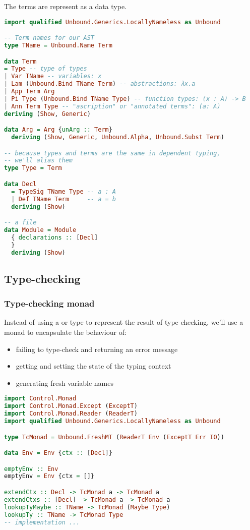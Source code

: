 \documentclass[
       embeddedlogo,
       english,
       lmodern,
       coorientadorbanca,
       noabntexcite
]{ufsc-thesis-rn46-2019}
\theoremstyle{definition}
\newcommand{\code}[1]{\text{\scpfamily\setlength\spaceskip{0.35em}#1}}
\begin{document}
The terms are represent as a data type.

\begin{lstlisting}[language=Haskell]
import qualified Unbound.Generics.LocallyNameless as Unbound

-- Term names for our AST
type TName = Unbound.Name Term

data Term
= Type -- type of types
| Var TName -- variables: x
| Lam (Unbound.Bind TName Term) -- abstractions: λx.a
| App Term Arg
| Pi Type (Unbound.Bind TName Type) -- function types: (x : A) -> B
| Ann Term Type -- "ascription" or "annotated terms": (a: A)
deriving (Show, Generic)

data Arg = Arg {unArg :: Term}
  deriving (Show, Generic, Unbound.Alpha, Unbound.Subst Term)

-- because types and terms are the same in dependent typing,
-- we'll alias them
type Type = Term

data Decl
  = TypeSig TName Type -- a : A
  | Def TName Term     -- a = b
  deriving (Show)

-- a file
data Module = Module
  { declarations :: [Decl]
  }
  deriving (Show)
\end{lstlisting}

\subsection{Type-checking}

\subsubsection{Type-checking monad}
Instead of using a \code{Maybe} or \code{Either} type to represent the result of type checking, we'll use a monad to encapsulate the behaviour of:
\begin{itemize}
       \item failing to type-check and returning an error message
       \item getting and setting the state of the typing context
       \item generating fresh variable names
\end{itemize}

\begin{lstlisting}[language=Haskell]
import Control.Monad
import Control.Monad.Except (ExceptT)
import Control.Monad.Reader (ReaderT)
import qualified Unbound.Generics.LocallyNameless as Unbound

type TcMonad = Unbound.FreshMT (ReaderT Env (ExceptT Err IO))

data Env = Env {ctx :: [Decl]}

emptyEnv :: Env
emptyEnv = Env {ctx = []}

extendCtx :: Decl -> TcMonad a -> TcMonad a
extendCtxs :: [Decl] -> TcMonad a -> TcMonad a
lookupTyMaybe :: TName -> TcMonad (Maybe Type)
lookupTy :: TName -> TcMonad Type
-- implementation ...
\end{lstlisting}
\end{document}
